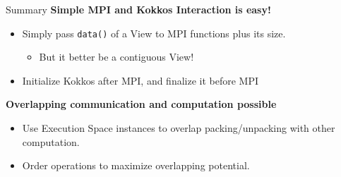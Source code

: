 \begin{frame}{Summary}
\textbf{Simple MPI and Kokkos Interaction is easy!}
\begin{itemize}
  \item Simply pass \texttt{data()} of a View to MPI functions plus its size.
  \begin{itemize}
    \item But it better be a contiguous View!
  \end{itemize}
  \item Initialize Kokkos after MPI, and finalize it before MPI
\end{itemize}

\vspace{10pt}
\textbf{Overlapping communication and computation possible}
\begin{itemize}
  \item Use Execution Space instances to overlap packing/unpacking with other computation.
  \item Order operations to maximize overlapping potential. 
\end{itemize}
\end{frame}
